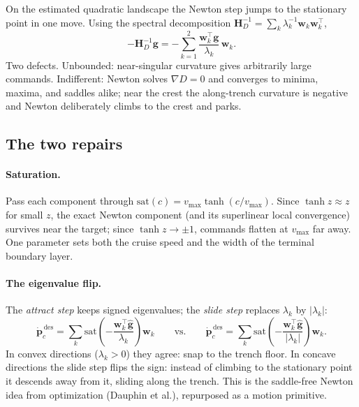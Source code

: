 \documentclass[11pt]{article}
\begin{document}
On the estimated quadratic landscape the Newton step jumps to the
stationary point in one move. Using the spectral decomposition
$\mathbf{H}_D^{-1} = \sum_k \lambda_k^{-1}\mathbf{w}_k\mathbf{w}_k^\top$,
\begin{equation}
-\mathbf{H}_D^{-1}\mathbf{g}
= -\sum_{k=1}^{2}\frac{\mathbf{w}_k^\top\mathbf{g}}{\lambda_k}\,\mathbf{w}_k .
\end{equation}
Two defects. Unbounded: near-singular curvature gives arbitrarily large
commands. Indifferent: Newton solves $\nabla D = 0$ and converges to
minima, maxima, and saddles alike; near the crest the along-trench
curvature is negative and Newton deliberately climbs to the crest and
parks.

\subsection{The two repairs}

\paragraph{Saturation.} Pass each component through
$\mathrm{sat}(c) = v_{\max}\tanh(c/v_{\max})$. Since $\tanh z \approx z$
for small $z$, the exact Newton component (and its superlinear local
convergence) survives near the target; since $\tanh z \to \pm 1$, commands
flatten at $v_{\max}$ far away. One parameter sets both the cruise speed
and the width of the terminal boundary layer.

\paragraph{The eigenvalue flip.} The \emph{attract step} keeps signed
eigenvalues; the \emph{slide step} replaces $\lambda_k$ by $|\lambda_k|$:
\begin{equation}
\dot{\mathbf{p}}_c^{\,\text{des}} = \sum_k \mathrm{sat}\!\left(
-\frac{\mathbf{w}_k^\top\hat{\mathbf{g}}}{\lambda_k}\right)\mathbf{w}_k
\qquad\text{vs.}\qquad
\dot{\mathbf{p}}_c^{\,\text{des}} = \sum_k \mathrm{sat}\!\left(
-\frac{\mathbf{w}_k^\top\hat{\mathbf{g}}}{|\lambda_k|}\right)\mathbf{w}_k .
\end{equation}
In convex directions ($\lambda_k > 0$) they agree: snap to the trench
floor. In concave directions the slide step flips the sign: instead of
climbing to the stationary point it descends away from it, sliding along
the trench. This is the saddle-free Newton idea from optimization
(Dauphin et al.), repurposed as a motion primitive.
\end{document}
